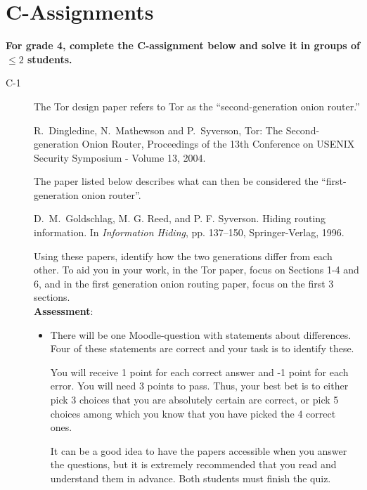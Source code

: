 \documentclass{article}
\begin{document}
\section*{C-Assignments}
\textbf{For grade 4, complete the C-assignment below and solve it in groups of $\leq 2$ students.}

\begin{description}
	\item[C-1]{The Tor design paper refers to Tor as the ``second-generation onion router.'' 
		\begin{center}
			\begin{minipage}{0.8\textwidth}
				R.~Dingledine, N.~Mathewson and P.~Syverson, Tor: The Second-generation Onion Router, Proceedings of the 13th Conference on USENIX Security Symposium - Volume 13, 2004.
			\end{minipage}
		\end{center}
		The paper listed below describes what can then be considered the ``first-generation onion router''.
		\begin{center}
			\begin{minipage}{0.8\textwidth}
				D.~M.~Goldschlag, M. G. Reed, and P. F. Syverson. Hiding routing information. In \textit{Information Hiding}, pp. 137--150, Springer-Verlag, 1996.
			\end{minipage}
		\end{center}
		Using these papers, identify how the two generations differ from each other. To aid you in your work, in the Tor paper, focus on Sections 1-4 and 6, and in the first generation onion routing paper, focus on the first 3 sections.\\
		\textbf{Assessment}:
		\begin{itemize}
			\item There will be one Moodle-question with statements about differences. Four of these statements are correct and your task is to identify these.  
			
			You will receive 1 point for each correct answer and -1 point for each error. You will need 3 points to pass. Thus, your best bet is to either pick 3 choices that you are absolutely certain are correct, or pick 5 choices among which you know that you have picked the 4 correct ones.
			
			 It can be a good idea to have the papers accessible when you answer the questions, but it is extremely recommended that you read and understand them in advance. Both students must finish the quiz.
		\end{itemize}
	}

\end{description}
\end{document}

